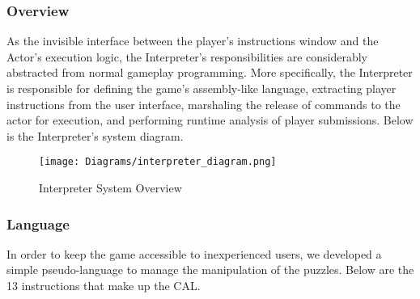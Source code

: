 \subsubsection{Overview}
As the invisible interface between the player's instructions window and the Actor's execution logic, the Interpreter's responsibilities are considerably abstracted from normal gameplay programming. More specifically, the Interpreter is responsible for defining the game's assembly-like language, extracting player instructions from the user interface, marshaling the release of commands to the actor for execution, and performing runtime analysis of player submissions. Below is the Interpreter's system diagram.

\begin{figure}[!hb]
    \caption{Interpreter System Overview}
    \label{fig:interpreter_system_overview}
    \centering
    \texttt{[image: Diagrams/interpreter\_diagram.png]}
\end{figure}


\subsubsection{Language}
In order to keep the game accessible to inexperienced users, we developed a simple
pseudo-language to manage the manipulation of the puzzles. Below are the 13 instructions that 
make up the CAL.

